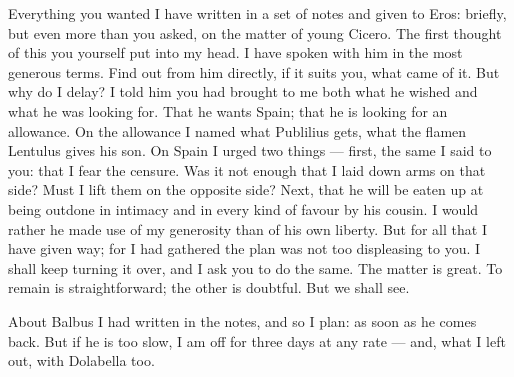 

 Everything you wanted I have written in a set of notes and given to Eros: briefly, but even more than you asked, on the matter of young Cicero. The first thought of this you yourself put into my head. I have spoken with him in the most generous terms. Find out from him directly, if it suits you, what came of it. But why do I delay? I told him you had brought to me both what he wished and what he was looking for. That he wants Spain; that he is looking for an allowance. On the allowance I named what Publilius gets, what the flamen Lentulus gives his son. On Spain I urged two things --- first, the same I said to you: that I fear the censure. Was it not enough that I laid down arms on that side? Must I lift them on the opposite side? Next, that he will be eaten up at being outdone in intimacy and in every kind of favour by his cousin. I would rather he made use of my generosity than of his own liberty. But for all that I have given way; for I had gathered the plan was not too displeasing to you. I shall keep turning it over, and I ask you to do the same. The matter is great. To remain is straightforward; the other is doubtful. But we shall see.

 About Balbus I had written in the notes, and so I plan: as soon as he comes back. But if he is too slow, I am off for three days at any rate --- and, what I left out, with Dolabella too.
